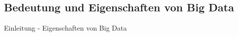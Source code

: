 
\subsection{Bedeutung und Eigenschaften von Big Data}
\label{sec:BigData}

Einleitung - Eigenschaften von Big Data

